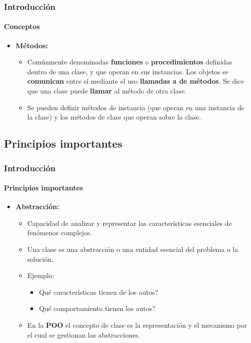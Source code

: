 \documentclass{beamer}
\begin{document}
		\begin{frame}
			\frametitle{Introducci\'on}
			\framesubtitle{Conceptos}

			\begin{itemize}
  				\item \textbf{M\'etodos:}
				\begin{itemize}
  					\item[] Com\'unmente denominadas \textbf{funciones} o \textbf{procedimientos} definidas dentro de una clase, y que operan en sus instancias. Los objetos se \textbf{comunican} entre s\'i mediante el uso \textbf{llamadas a de m\'etodos}. Se dice que una clase puede \textbf{llamar} al m\'etodo de otra clase.
  					\item[] Se pueden definir m\'etodos de instancia (que operan en una instancia de la clase) y los m\'etodos de clase que operan sobre la clase.
				\end{itemize}
			\end{itemize}
		\end{frame}

	\subsection{Principios importantes}

		\begin{frame}
			\frametitle{Introducci\'on}
			\framesubtitle{Principios importantes}

			\begin{itemize}
  				\item \textbf{Abstracci\'on:}
				\begin{itemize}
  					\item Capacidad de analizar y representar las caracter\'isticas esenciales de fen\'omenos complejos.
					\item Una clase es una abstracci\'on o una entidad esencial del problema o la soluci\'on.
					\item Ejemplo: 
					\begin{itemize}
  						\item[] Qu\'e caracter\'isticas tienen de los autos?
  						\item[] Qu\'e comportamiento tienen los autos?
					\end{itemize}
					\item En la \textbf{POO} el concepto de clase es la representaci\'on y el mecanismo por el cual se gestionan las abstracciones. 			
				\end{itemize}
			\end{itemize}
		\end{frame}
		
\end{document}
